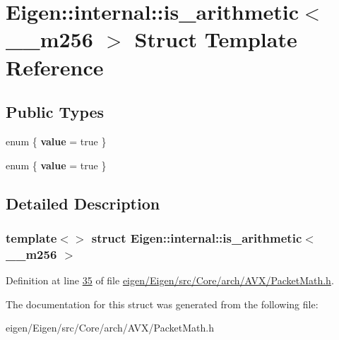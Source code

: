 \hypertarget{struct_eigen_1_1internal_1_1is__arithmetic_3_01____m256_01_4}{}\section{Eigen\+:\+:internal\+:\+:is\+\_\+arithmetic$<$ \+\_\+\+\_\+m256 $>$ Struct Template Reference}
\label{struct_eigen_1_1internal_1_1is__arithmetic_3_01____m256_01_4}
\subsection*{Public Types}
\begin{DoxyCompactItemize}
\item 
\mbox{\label{struct_eigen_1_1internal_1_1is__arithmetic_3_01____m256_01_4_ae9225319c8d0d6de9999e387b787d608}} 
enum \{ {\bfseries value} = true
 \}
\item 
\mbox{\label{struct_eigen_1_1internal_1_1is__arithmetic_3_01____m256_01_4_a1574b8bbdb2eba71d7a639d27b9d164d}} 
enum \{ {\bfseries value} = true
 \}
\end{DoxyCompactItemize}


\subsection{Detailed Description}
\subsubsection*{template$<$$>$\newline
struct Eigen\+::internal\+::is\+\_\+arithmetic$<$ \+\_\+\+\_\+m256 $>$}



Definition at line \hyperlink{eigen_2_eigen_2src_2_core_2arch_2_a_v_x_2_packet_math_8h_source_l00035}{35} of file \hyperlink{eigen_2_eigen_2src_2_core_2arch_2_a_v_x_2_packet_math_8h_source}{eigen/\+Eigen/src/\+Core/arch/\+A\+V\+X/\+Packet\+Math.\+h}.



The documentation for this struct was generated from the following file\+:\begin{DoxyCompactItemize}
\item 
eigen/\+Eigen/src/\+Core/arch/\+A\+V\+X/\+Packet\+Math.\+h\end{DoxyCompactItemize}
